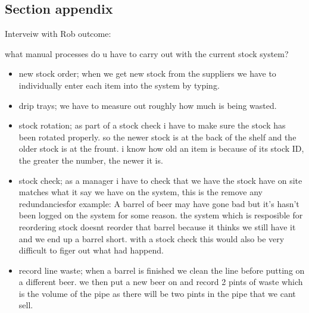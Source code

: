 \subsection{Section appendix}

Interveiw with Rob outcome:

what manual processes do u have to carry out with the current stock system?
\begin{itemize}
    \item new stock order; when we get new stock from the suppliers we have to individually enter each item into the system by typing.
    \item drip trays; we have to measure out roughly how much is being wasted.
	\item stock rotation; as part of a stock check i have to make sure the stock has been rotated properly. so the newer stock is at the back of the shelf and the older stock is at the frount. i know how old an item is because of its stock ID, the greater the number, the newer it is.
	\item stock check; as a manager i have to check that we have the stock have on site matches what it say we have on the system, this is the remove any redundanciesfor example: A barrel of beer may have gone bad but it's hasn't been logged on the system for some reason. the system which is resposible for reordering stock doesnt reorder that barrel because it thinks we still have it and we end up a barrel short. with a stock check this would also be very difficult to figer out what had happend.
	\item record line waste; when a barrel is finished we clean the line before putting on a different beer. we then put a new beer on and record 2 pints of waste which is the volume of the pipe as there will be two pints in the pipe that we cant sell.
\end{itemize}

